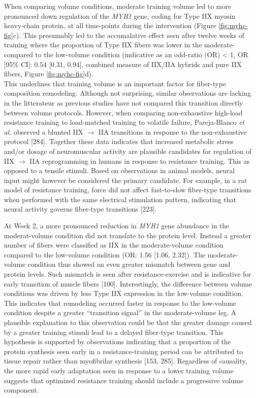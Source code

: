 \documentclass[twoside,10pt]{gihclass} %
\begin{document}
When comparing volume conditions, moderate training volume led to more pronounced down regulation of the \emph{MYH1} gene, coding for Type IIX myosin heavy-chain protein, at all time-points during the intervention (Figure \ref{fig:myhc-fig}c). This presumably led to the accumalative effect seen after twelve weeks of training where the proportion of Type IIX fibers was lower in the moderate- compared to the low-volume condition (indicative as an odd-ratio (OR) \textless{} 1, OR {[}95\% CI{]}: 0.54 {[}0.31, 0.94{]}, combined measure of IIX/IIA hybrids and pure IIX fibers, Figure \ref{fig:myhc-fig}d).\\
This underlines that training volume is an important factor for fiber-type composition remodeling. Although not surprising, similar observations are lacking in the litterateur as previous studies have not compared this transition directly between volume protocols.
However, when comparing non-exhaustive high-load resistance training to load-matched training to volatile failure, Pareja-Blanco \emph{et al.} observed a blunted IIX \(\rightarrow\) IIA transitions in response to the non-exhaustive protocol
{[}284{]}.
Together these data indicates that increased metabolic stress and/or dosage of neuromuscular activity are plausible candidates for regulation of IIX \(\rightarrow\) IIA reprogramming in humans in response to resistance training.
This as opposed to a tensile stimuli.
Based on observations in animal models, neural input might however be considered the primary candidate.
For example, in a rat model of resistance training, force did not affect fast-to-slow fiber-type transitions when performed with the same electrical stimulation pattern, indicating that neural activity governs fiber-type transitions
{[}223{]}.

At Week 2, a more pronounced reduction in \emph{MYH1} gene abundance in the moderat-volume condition did not translate to the protein level. Instead a greater number of fibers were classified as IIX in the moderate-volume condition compared to the low-volume condition (OR: 1.56 {[}1.06, 2.32{]}).
The moderate-volume condition thus showed an even greater mismatch between gene and protein levels.
Such mismatch is seen after resistance-exercise and is indicative for early transition of muscle fibers
{[}100{]}.
Interestingly, the difference between volume conditions was driven by less Type IIX expression in the low-volume condition.
This indicates that remodeling occurred faster in response to the low-volume condition despite a greater ``transition signal'' in the moderate-volume leg.
A plausible explanation to this observation could be that the greater damage caused by a greater training stimuli lead to a delayed fiber-type transition.
This hypothesis is supported by observations indicating that a proportion of the protein synthesis seen early in a resistance-training period can be attributed to tissue repair rather than myofibrilar synthesis
{[}153, 285{]}.
Regardless of causality, the more rapid early adaptation seen in response to a lower training volume suggests that optimized resistance training should include a progressive volume component.
\end{document}
